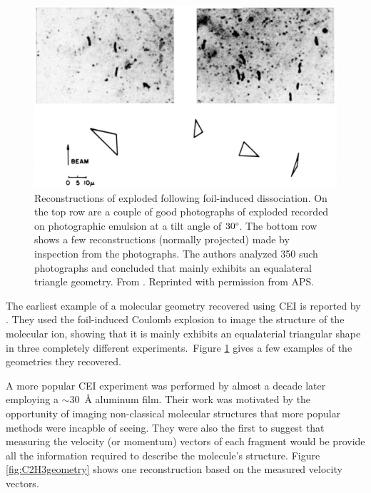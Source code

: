\begin{figure}[H]
  \centering
  \includegraphics[width=\textwidth]{gfx/HydrogenTrimerReconstruction}
  \caption[Reconstructions of exploded  following foil-induced dissociation.]
  {Reconstructions of exploded  following foil-induced dissociation. On the top row are a couple of good photographs of exploded  recorded on photographic emulsion at a tilt angle of $30\degree$. The bottom row shows a few reconstructions (normally projected) made by inspection from the photographs. The authors analyzed 350 such photographs and concluded that  mainly exhibits an equalateral triangle geometry. From \citet{Gaillard78}. Reprinted with permission from APS.}
  \label{fig:hydrogenTrimer}
\end{figure}

The earliest example of a molecular geometry recovered using CEI is reported by \citet{Gaillard78}. They used the foil-induced Coulomb explosion to image the structure of the  molecular ion, showing that it is mainly exhibits an equalaterial triangular shape in three completely different experiments.\footnotemark ~Figure \ref{fig:hydrogenTrimer} gives a few examples of the geometries they recovered.


A more popular CEI experiment was performed by \citet{Vager89} almost a decade later employing a $\sim$\SI{30}{\angstrom} aluminum film. Their work was motivated by the opportunity of imaging non-classical molecular structures that more popular methods were incapble of seeing. They were also the first to suggest that measuring the velocity (or momentum) vectors of each fragment would be provide all the information required to describe the molecule's structure. Figure \ref{fig:C2H3geometry} shows one reconstruction based on the measured velocity vectors.

